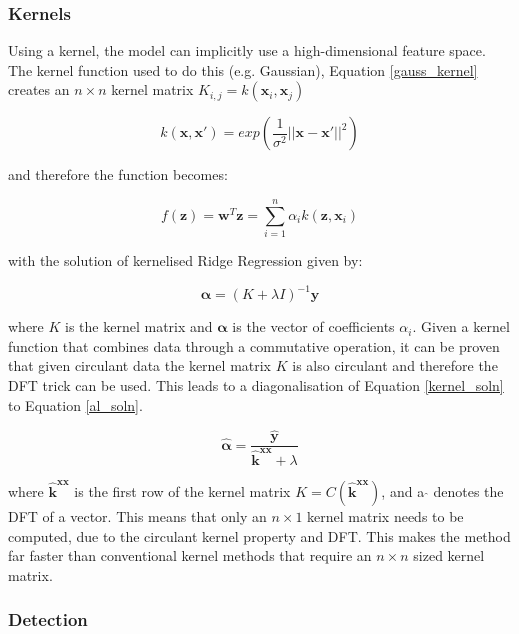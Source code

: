\documentclass[11pt,twoside]{report}
\begin{document}
\subsubsection{Kernels}\label{kcf_kernels}

Using a kernel, the model can implicitly use a high-dimensional feature space. The kernel function used to do this (e.g. Gaussian), Equation \ref{gauss_kernel} creates an $n \times n$ kernel matrix $K_{i,j} = k(\mathbf{x}_{i},\mathbf{x}_{j})$

\begin{equation}
k(\mathbf{x},\mathbf{x}') = exp (\frac{1}{\sigma^{2}} ||\mathbf{x} - \mathbf{x}'||^{2})
\label{gauss_kernel}
\end{equation}

and therefore the function becomes:

\begin{equation}
f(\mathbf{z}) = \mathbf{w}^{T}\mathbf{z} = \sum_{i=1}^{n} \alpha_{i}k(\mathbf{z},\mathbf{x}_{i})
\end{equation}

with the solution of kernelised Ridge Regression given by:

\begin{equation}
\mathbf{\alpha} = (K + \lambda I)^{-1} \mathbf{y}
\label{kernel_soln}
\end{equation}

where $K$ is the kernel matrix and $\mathbf{\alpha}$ is the vector of coefficients $\alpha_{i}$. Given a kernel function that combines data through a commutative operation, it can be proven that given circulant data the kernel matrix $K$ is also circulant and therefore the DFT trick can be used. This leads to a diagonalisation of Equation \ref{kernel_soln} to Equation \ref{al_soln}.

\begin{equation}
\mathbf{\hat{\alpha}} = \frac{\mathbf{\hat{y}}}{\mathbf{\hat{k}}^{\mathbf{xx}} + \lambda}
\label{al_soln}
\end{equation}

where $\mathbf{\hat{k}}^{\mathbf{xx}}$ is the first row of the kernel matrix $K = C(\mathbf{\hat{k}}^{\mathbf{xx}})$, and a $\hat{ }$ denotes the DFT of a vector. This means that only an $n \times 1$ kernel matrix needs to be computed, due to the circulant kernel property and DFT. This makes the method far faster than conventional kernel methods that require an $n \times n$ sized kernel matrix.


\subsubsection{Detection}
\end{document}
